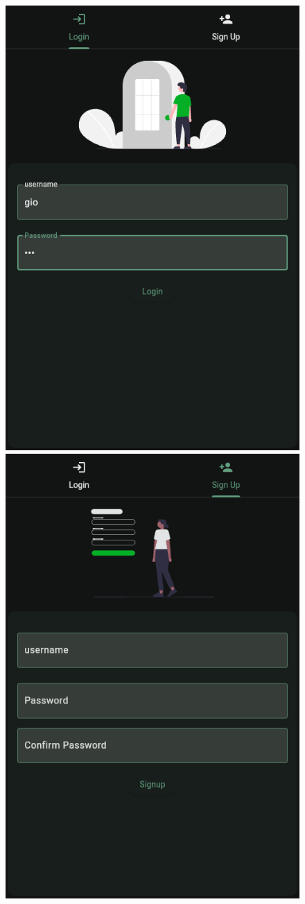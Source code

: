 \documentclass[a4paper,12pt]{article}
\begin{document}
\begin{figure}[H]
    \begin{minipage}{0.40\textwidth}
        \centering
        \includegraphics[width=0.8\linewidth]{img/login.png}
    \end{minipage}\hfill
    \begin{minipage}{0.40\textwidth}
        \centering
        \includegraphics[width=0.8\linewidth]{img/registrazione.png}

\end{minipage}
\end{figure}
\end{document}
